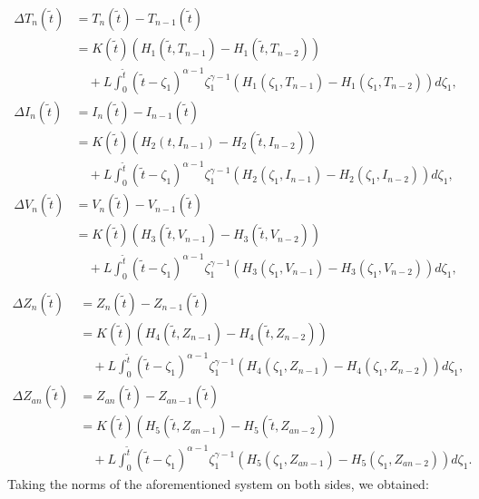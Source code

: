 \documentclass{article}
\theoremstyle{plain}
\theoremstyle{definition}
\numberwithin{equation}{section}
\begin{document}
\begin{align*}
	\Delta T_{n}(\tilde{t}) &= T_{n}(\tilde{t}) - T_{n-1}(\tilde{t}) \\
	&= K(\tilde{t}) \left( H_1(\tilde{t}, T_{n-1}) - H_1(\tilde{t}, T_{n-2}) \right) \\
	&\quad + L \int_0^{\tilde{t}} (\tilde{t}-\zeta_1)^{\alpha-1} \zeta_1^{\gamma-1} \left( H_1(\zeta_1, T_{n-1}) - H_1(\zeta_1, T_{n-2}) \right) d\zeta_1, \\[10pt]
	\Delta I_{n}(\tilde{t}) &= I_{n}(\tilde{t}) - I_{n-1}(\tilde{t}) \\
	&= K(\tilde{t}) \left( H_2(t, I_{n-1}) - H_2(\tilde{t}, I_{n-2}) \right) \\
	&\quad + L \int_0^{\tilde{t}} (\tilde{t}-\zeta_1)^{\alpha-1} \zeta_1^{\gamma-1} \left( H_2(\zeta_1, I_{n-1}) - H_2(\zeta_1, I_{n-2}) \right) d\zeta_1, \\[10pt]
	\Delta V_{n}(\tilde{t}) &= V_{n}(\tilde{t}) - V_{n-1}(\tilde{t}) \\
	&= K(\tilde{t}) \left( H_3(\tilde{t}, V_{n-1}) - H_3(\tilde{t}, V_{n-2}) \right) \\
	&\quad + L \int_0^{\tilde{t}} (\tilde{t}-\zeta_1)^{\alpha-1} \zeta_1^{\gamma-1} \left( H_3(\zeta_1, V_{n-1}) - H_3(\zeta_1, V_{n-2}) \right) d\zeta_1, \\[10pt]
\end{align*}
   \begin{align*} 
	\Delta Z_{n}(\tilde{t}) &= Z_{n}(\tilde{t}) - Z_{n-1}(\tilde{t}) \\
	&= K(\tilde{t}) \left( H_4(\tilde{t}, Z_{n-1}) - H_4(\tilde{t}, Z_{n-2}) \right) \\
	&\quad + L \int_0^{\tilde{t}} (\tilde{t}-\zeta_1)^{\alpha-1} \zeta_1^{\gamma-1} \left( H_4(\zeta_1, Z_{n-1}) - H_4(\zeta_1, Z_{n-2}) \right) d\zeta_1, \\[10pt]
	\Delta Z_{an}(\tilde{t}) &= Z_{an}(\tilde{t}) - Z_{an-1}(\tilde{t}) \\
	&= K(\tilde{t}) \left( H_5(\tilde{t}, Z_{an-1}) - H_5(\tilde{t}, Z_{an-2}) \right) \\
	&\quad + L \int_0^{\tilde{t}} (\tilde{t}-\zeta_1)^{\alpha-1} \zeta_1^{\gamma-1} \left( H_5(\zeta_1, Z_{an-1}) - H_5(\zeta_1, Z_{an-2}) \right) d\zeta_1.
\end{align*}
Taking the norms of the aforementioned system on both sides, we obtained:
\end{document}
